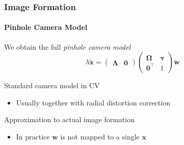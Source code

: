 \documentclass[xetex,professionalfont]{beamer}
\renewcommand{\vec}[1]{\ensuremath{\mathbf{#1}}}
\newcommand{\vw}{\vec{w}}
\newcommand{\vx}{\vec{x}}
\newcommand{\intr}{\boldsymbol{\Lambda}}
\begin{document}
\begin{frame}
\frametitle{Image Formation}
\framesubtitle{Pinhole Camera Model}

We obtain the full \emph{pinhole camera model}
\[\lambda\tilde{\vx}=\begin{pmatrix}
    \intr & \vec{0}
\end{pmatrix}
\begin{pmatrix}
    \boldsymbol{\Omega} & \boldsymbol{\tau} \\ \vec{0}^\top & 1
\end{pmatrix}\tilde{\vw}\]

\bigskip
Standard camera model in CV
\begin{itemize}
    \item Usually together with radial distortion correction %
\end{itemize}

\bigskip
Approximation to actual image formation
\begin{itemize}
    \item In practice $\vw$ is not mapped to a single $\vx$ %
\end{itemize}

\end{frame}

\end{document}
